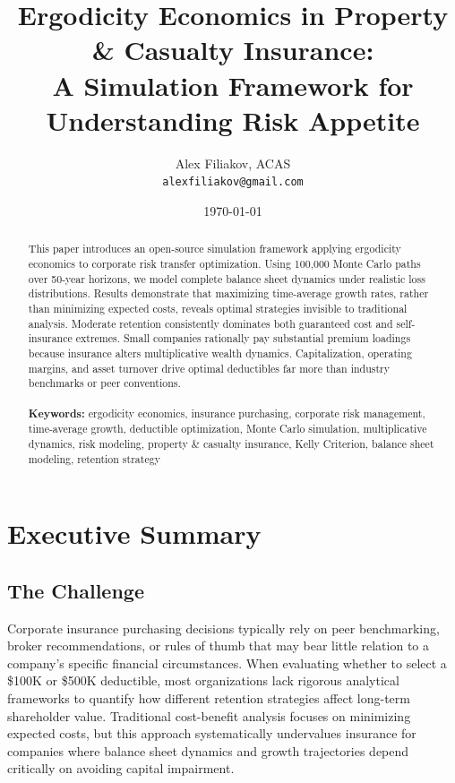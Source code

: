 \documentclass[11pt,letterpaper]{article}
\title{\Large \textbf{Ergodicity Economics in Property \& Casualty Insurance: \\
A Simulation Framework for Understanding Risk Appetite}}
\author{Alex Filiakov, ACAS\\
\texttt{alexfiliakov@gmail.com}}
\date{\today}
\begin{document}
\maketitle

\begin{abstract}
This paper introduces an open-source simulation framework applying ergodicity economics to corporate risk transfer optimization. Using 100,000 Monte Carlo paths over 50-year horizons, we model complete balance sheet dynamics under realistic loss distributions. Results demonstrate that maximizing time-average growth rates, rather than minimizing expected costs, reveals optimal strategies invisible to traditional analysis. Moderate retention consistently dominates both guaranteed cost and self-insurance extremes. Small companies rationally pay substantial premium loadings because insurance alters multiplicative wealth dynamics. Capitalization, operating margins, and asset turnover drive optimal deductibles far more than industry benchmarks or peer conventions.
\\\\
\textbf{Keywords:} ergodicity economics, insurance purchasing, corporate risk management, time-average growth, deductible optimization, Monte Carlo simulation, multiplicative dynamics, risk modeling, property \& casualty insurance, Kelly Criterion, balance sheet modeling, retention strategy
\end{abstract}

\newpage
\tableofcontents
\newpage

\section{Executive Summary}

\subsection{The Challenge}

Corporate insurance purchasing decisions typically rely on peer benchmarking, broker recommendations, or rules of thumb that may bear little relation to a company's specific financial circumstances. When evaluating whether to select a \$100K or \$500K deductible, most organizations lack rigorous analytical frameworks to quantify how different retention strategies affect long-term shareholder value. Traditional cost-benefit analysis focuses on minimizing expected costs, but this approach systematically undervalues insurance for companies where balance sheet dynamics and growth trajectories depend critically on avoiding capital impairment.
\end{document}
